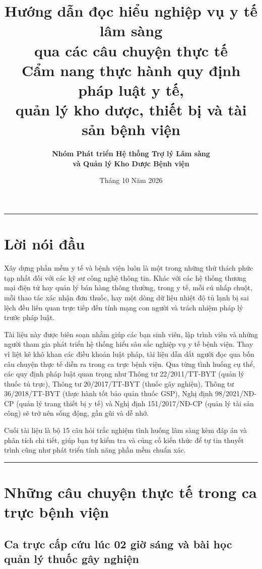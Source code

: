 \documentclass[12pt,a4paper]{article}
\title{\textbf{\Large Hướng dẫn đọc hiểu nghiệp vụ y tế lâm sàng\\[0.2em]qua các câu chuyện thực tế}\\[0.5em]
\large Cẩm nang thực hành quy định pháp luật y tế,\\[0.2em]quản lý kho dược, thiết bị và tài sản bệnh viện}
\author{\textbf{Nhóm Phát triển Hệ thống Trợ lý Lâm sàng}\\[0.2em]\textbf{và Quản lý Kho Dược Bệnh viện}}
\date{Tháng 10 Năm 2026}
\begin{document}
\maketitle

\hrule
\vspace{0.8em}

\section*{Lời nói đầu}

Xây dựng phần mềm y tế và bệnh viện luôn là một trong những thử thách phức tạp nhất đối với các kỹ sư công nghệ thông tin. Khác với các hệ thống thương mại điện tử hay quản lý bán hàng thông thường, trong y tế, mỗi cú nhấp chuột, mỗi thao tác xác nhận đơn thuốc, hay một dòng dữ liệu nhiệt độ tủ lạnh bị sai lệch đều liên quan trực tiếp đến tính mạng con người và trách nhiệm pháp lý trước pháp luật.

Tài liệu này được biên soạn nhằm giúp các bạn sinh viên, lập trình viên và những người tham gia phát triển hệ thống hiểu sâu sắc nghiệp vụ y tế bệnh viện. Thay vì liệt kê khô khan các điều khoản luật pháp, tài liệu dẫn dắt người đọc qua bốn câu chuyện thực tế diễn ra trong ca trực bệnh viện. Qua từng tình huống cụ thể, các quy định pháp luật quan trọng như Thông tư 22/2011/TT-BYT (quản lý thuốc tủ trực), Thông tư 20/2017/TT-BYT (thuốc gây nghiện), Thông tư 36/2018/TT-BYT (thực hành tốt bảo quản thuốc GSP), Nghị định 98/2021/NĐ-CP (quản lý trang thiết bị y tế) và Nghị định 151/2017/NĐ-CP (quản lý tài sản công) sẽ trở nên sống động, gần gũi và dễ nhớ.

Cuối tài liệu là bộ 15 câu hỏi trắc nghiệm tình huống lâm sàng kèm đáp án và phân tích chi tiết, giúp bạn tự kiểm tra và củng cố kiến thức để tự tin thuyết trình cũng như phát triển tính năng phần mềm chuẩn xác.

\vspace{1em}
\hrule
\vspace{1.5em}

\section{Những câu chuyện thực tế trong ca trực bệnh viện}

\subsection{Ca trực cấp cứu lúc 02 giờ sáng và bài học quản lý thuốc gây nghiện}
\end{document}
